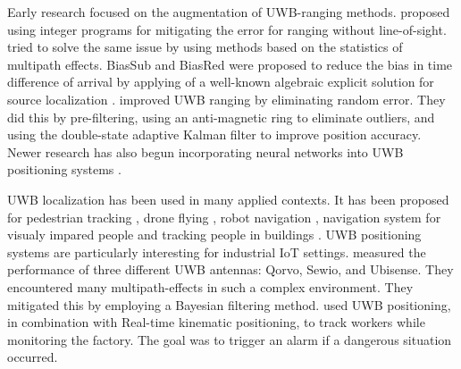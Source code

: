 Early research focused on the augmentation of UWB-ranging methods.
\cite{venkatesh2007nlos} proposed using integer programs for mitigating the error for ranging without line-of-sight.
\cite{guvencc2007nlos} tried to solve the same issue by using methods based on the statistics of multipath effects.
BiasSub and BiasRed were proposed to reduce the bias in time difference of arrival by applying of a well-known algebraic explicit solution for source localization  \cite{ho2012bias}.
\cite{fan2017performance} improved UWB ranging by eliminating random error. They did this by pre-filtering, using an anti-magnetic ring to eliminate outliers, and using the double-state adaptive Kalman filter to improve position accuracy.
Newer research has also begun incorporating neural networks into UWB positioning systems \cite{stahlke2020nlos, ridolfi2021uwb, che2020machine}.

UWB localization has been used in many applied contexts.
It has been proposed for pedestrian tracking \cite{otim2019effects}, drone flying \cite{macoir2019uwb}, robot navigation \cite{zhu2020adapted}, navigation system for visualy impared people \cite{rosiak2024effectiveness} and tracking people in buildings \cite{elbaum2024investigating}.
UWB positioning systems are particularly interesting for industrial IoT settings.
\cite{barbieri2021uwb} measured the performance of three different UWB antennas: Qorvo, Sewio, and Ubisense. They encountered many multipath-effects in such a complex environment. They mitigated this by employing a Bayesian filtering method.
\cite{belli2024cloud} used UWB positioning, in combination with Real-time kinematic positioning, to track workers while monitoring the factory. The goal was to trigger an alarm if a dangerous situation occurred.


